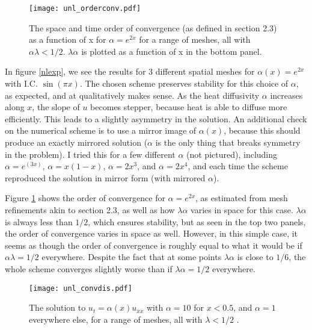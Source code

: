 \documentclass[11pt]{amsart}
\begin{document}
\begin{figure}
\begin{center} 
\texttt{[image: unl\_orderconv.pdf]}
\caption{The space and time order of convergence (as defined in section 2.3) as a function of x for  $\alpha = e^{2x} $ for a range of meshes, all with $\alpha\lambda < 1/2$. $\lambda\alpha$ is plotted as a function of x in the bottom panel. }
\label{nlorder} 
\end{center}
\end{figure}

In figure \ref{nlexp}, we see the results for 3 different spatial meshes for $\alpha(x) = e^{2x}$ with I.C. $\sin(\pi x)$. The chosen scheme preserves stability for this choice of $\alpha$, as expected, and at qualitatively makes sense. As the heat diffusivity $\alpha$ increases along $x$, the slope of $u$ becomes stepper, because heat is able to diffuse more efficiently. This leads to a slightly asymmetry in the solution. An additional check on the numerical scheme is to use a mirror image of $\alpha(x)$, because this should produce an exactly mirrored solution ($\alpha$ is the only thing that breaks symmetry in the problem).  I tried this for a few different $\alpha$ (not pictured), including $\alpha = e^(3x)$, $\alpha = x(1-x)$,  $\alpha = 2x^3$, and $\alpha = 2x^4$, and each time the scheme reproduced the solution in mirror form (with mirrored $\alpha$). 

Figure \ref{nlorder} shows the order of convergence for $\alpha = e^{2x}$, as estimated from mesh refinements akin to section 2.3, as well as how $\lambda \alpha$ varies in space for this case. $\lambda \alpha$ is always less than $1/2$, which ensures stability, but as seen in the top two panels, the order of convergence varies in space as well. However, in this simple case, it seems as though the order of convergence is roughly equal to what it would be if $\alpha\lambda = 1/2$ everywhere. Despite the fact that at some points $\lambda \alpha$ is close to $1/6$, the whole scheme converges slightly worse than if  $\lambda \alpha = 1/2$ everywhere. 


\begin{figure}
\begin{center} 
\texttt{[image: unl\_convdis.pdf]}
\caption{The solution to $u_t =\alpha(x) u_{xx}$ with  $\alpha= 10$ for $x<0.5$, and $\alpha = 1$ everywhere else, for a range of meshes, all with $\lambda < 1/2$ .  }
\label{nlexpdis} 
\end{center}
\end{figure}
\end{document}
